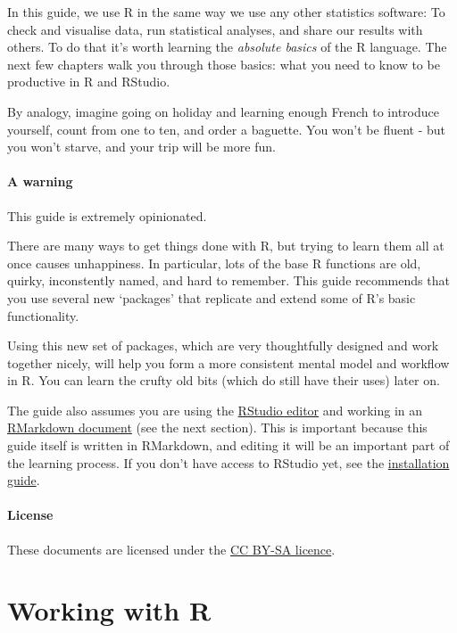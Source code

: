 \documentclass[]{article}
\let\oldparagraph\paragraph
\renewcommand{\paragraph}[1]{\oldparagraph{#1}\mbox{}}
\theoremstyle{definition}
\theoremstyle{definition}
\theoremstyle{definition}
\theoremstyle{remark}
\begin{document}
In this guide, we use R in the same way we use any other statistics
software: To check and visualise data, run statistical analyses, and
share our results with others. To do that it's worth learning the
\emph{absolute basics} of the R language. The next few chapters walk you
through those basics: what you need to know to be productive in R and
RStudio.

By analogy, imagine going on holiday and learning enough French to
introduce yourself, count from one to ten, and order a baguette. You
won't be fluent - but you won't starve, and your trip will be more fun.

\paragraph{A warning}\label{a-warning}

This guide is extremely opinionated.

There are many ways to get things done with R, but trying to learn them
all at once causes unhappiness. In particular, lots of the base R
functions are old, quirky, inconstently named, and hard to remember.
This guide recommends that you use several new `packages' that replicate
and extend some of R's basic functionality.

Using this new set of packages, which are very thoughtfully designed and
work together nicely, will help you form a more consistent mental model
and workflow in R. You can learn the crufty old bits (which do still
have their uses) later on.

The guide also assumes you are using the
\protect\hyperlink{rstudio}{RStudio editor} and working in an
\protect\hyperlink{rmarkdown}{RMarkdown document} (see the next
section). This is important because this guide itself is written in
RMarkdown, and editing it will be an important part of the learning
process. If you don't have access to RStudio yet, see the
\href{installation.html}{installation guide}.

\paragraph{License}\label{license}

These documents are licensed under the
\href{https://creativecommons.org/licenses/by-sa/4.0/}{CC BY-SA
licence}.

\section{Working with R}\label{r-basics}
\end{document}
